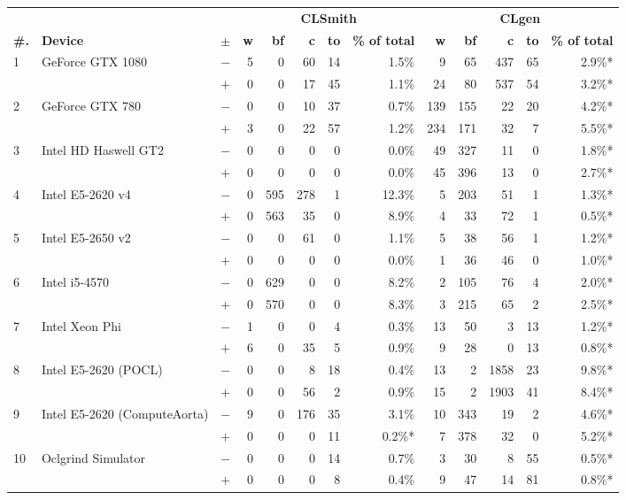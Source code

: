   \begin{tabular}{lll | rrrrr | rrrrr }
  \toprule
  & & & \multicolumn{5}{c|}{\textbf{CLSmith}} & \multicolumn{5}{c}{\textbf{CLgen}} \\
  \textbf{\#.} & \textbf{Device} & $\pm$ &
  \textbf{w} & \textbf{bf} & \textbf{c} & \textbf{to} & \textbf{\% of total} &
  \textbf{w} & \textbf{bf} & \textbf{c} & \textbf{to} & \textbf{\% of total} \\
  \midrule
  \multirow{ 2}{*}{1} & \multirow{ 2}{*}{GeForce GTX 1080} & $-$ & 5 & 0 & 60 & 14 & 1.5\%       & 9 & 65 & 437 & 65 & 2.9\%* \\& & $+$ & 0 & 0 & 17 & 45 & 1.1\% & 24 & 80 & 537 & 54 & 3.2\%* \\
\hline
\multirow{ 2}{*}{2} & \multirow{ 2}{*}{GeForce GTX 780} & $-$ & 0 & 0 & 10 & 37 & 0.7\%       & 139 & 155 & 22 & 20 & 4.2\%* \\& & $+$ & 3 & 0 & 22 & 57 & 1.2\% & 234 & 171 & 32 & 7 & 5.5\%* \\
\hline
\multirow{ 2}{*}{3} & \multirow{ 2}{*}{Intel HD Haswell GT2} & $-$ & 0 & 0 & 0 & 0 & 0.0\%       & 49 & 327 & 11 & 0 & 1.8\%* \\& & $+$ & 0 & 0 & 0 & 0 & 0.0\% & 45 & 396 & 13 & 0 & 2.7\%* \\
\hline
\multirow{ 2}{*}{4} & \multirow{ 2}{*}{Intel E5-2620 v4} & $-$ & 0 & 595 & 278 & 1 & 12.3\%       & 5 & 203 & 51 & 1 & 1.3\%* \\& & $+$ & 0 & 563 & 35 & 0 & 8.9\% & 4 & 33 & 72 & 1 & 0.5\%* \\
\hline
\multirow{ 2}{*}{5} & \multirow{ 2}{*}{Intel E5-2650 v2} & $-$ & 0 & 0 & 61 & 0 & 1.1\%       & 5 & 38 & 56 & 1 & 1.2\%* \\& & $+$ & 0 & 0 & 0 & 0 & 0.0\% & 1 & 36 & 46 & 0 & 1.0\%* \\
\hline
\multirow{ 2}{*}{6} & \multirow{ 2}{*}{Intel i5-4570} & $-$ & 0 & 629 & 0 & 0 & 8.2\%       & 2 & 105 & 76 & 4 & 2.0\%* \\& & $+$ & 0 & 570 & 0 & 0 & 8.3\% & 3 & 215 & 65 & 2 & 2.5\%* \\
\hline
\multirow{ 2}{*}{7} & \multirow{ 2}{*}{Intel Xeon Phi} & $-$ & 1 & 0 & 0 & 4 & 0.3\%       & 13 & 50 & 3 & 13 & 1.2\%* \\& & $+$ & 6 & 0 & 35 & 5 & 0.9\% & 9 & 28 & 0 & 13 & 0.8\%* \\
\hline
\multirow{ 2}{*}{8} & \multirow{ 2}{*}{Intel E5-2620 (POCL)} & $-$ & 0 & 0 & 8 & 18 & 0.4\%       & 13 & 2 & 1858 & 23 & 9.8\%* \\& & $+$ & 0 & 0 & 56 & 2 & 0.9\% & 15 & 2 & 1903 & 41 & 8.4\%* \\
\hline
\multirow{ 2}{*}{9} & \multirow{ 2}{*}{Intel E5-2620 (ComputeAorta)} & $-$ & 9 & 0 & 176 & 35 & 3.1\%       & 10 & 343 & 19 & 2 & 4.6\%* \\& & $+$ & 0 & 0 & 0 & 11 & 0.2\%* & 7 & 378 & 32 & 0 & 5.2\%* \\
\hline
\multirow{ 2}{*}{10} & \multirow{ 2}{*}{Oclgrind Simulator} & $-$ & 0 & 0 & 0 & 14 & 0.7\%       & 3 & 30 & 8 & 55 & 0.5\%* \\& & $+$ & 0 & 0 & 0 & 8 & 0.4\% & 9 & 47 & 14 & 81 & 0.8\%* \\
  \bottomrule
\end{tabular}

